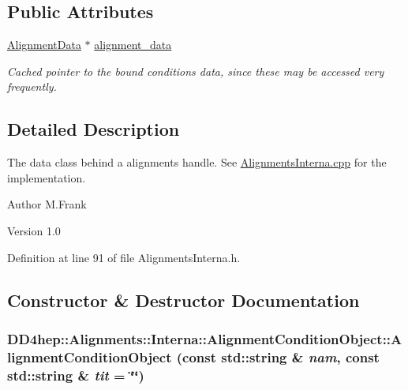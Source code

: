 \subsection*{Public Attributes}
\begin{DoxyCompactItemize}
\item 
\hyperlink{class_d_d4hep_1_1_alignments_1_1_alignment_data}{AlignmentData} $\ast$ \hyperlink{class_d_d4hep_1_1_alignments_1_1_interna_1_1_alignment_condition_object_ac7ed3f9b51220db13f6d829198f3ea10}{alignment\_\-data}
\begin{DoxyCompactList}\small\item\em Cached pointer to the bound conditions data, since these may be accessed very frequently. \item\end{DoxyCompactList}\end{DoxyCompactItemize}


\subsection{Detailed Description}
The data class behind a alignments handle. See \hyperlink{_alignments_interna_8cpp}{AlignmentsInterna.cpp} for the implementation.

\begin{DoxyAuthor}{Author}
M.Frank 
\end{DoxyAuthor}
\begin{DoxyVersion}{Version}
1.0 
\end{DoxyVersion}


Definition at line 91 of file AlignmentsInterna.h.

\subsection{Constructor \& Destructor Documentation}
\hypertarget{class_d_d4hep_1_1_alignments_1_1_interna_1_1_alignment_condition_object_a3156840cdc6751011cd6128bfd2c1c5a}{
\subsubsection[{AlignmentConditionObject}]{\setlength{\rightskip}{0pt plus 5cm}DD4hep::Alignments::Interna::AlignmentConditionObject::AlignmentConditionObject (const std::string \& {\em nam}, \/  const std::string \& {\em tit} = {\ttfamily \char`\"{}\char`\"{}})}}
\label{class_d_d4hep_1_1_alignments_1_1_interna_1_1_alignment_condition_object_a3156840cdc6751011cd6128bfd2c1c5a}


